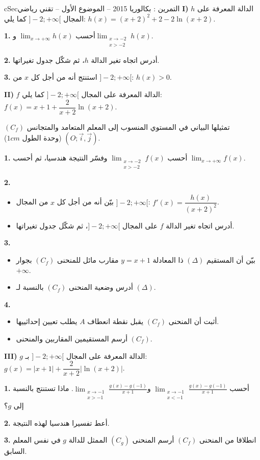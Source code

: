 \documentclass[12pt,a4paper]{article}
\newenvironment{BOX}[2]{\begin{otherlanguage}{english}\begin{arbox}{#1}{#2}}{\end{arbox}\end{otherlanguage}}
\newcounter{exo}
\newenvironment{tamrin}[1]{\stepcounter{exo}\begin{BOX}{cSec}{التمرين \theexo: #1}}{\end{BOX}}
\newenvironment{sq}{\begin{itemize}[leftmargin=2.4em,itemsep=3pt]}{\end{itemize}}
\newcommand{\qa}{\item[(أ)]}\newcommand{\qb}{\item[(ب)]}\newcommand{\qc}{\item[(جـ)]}\newcommand{\qd}{\item[(د)]}\newcommand{\qe}{\item[(هـ)]}
\newcommand{\QQ}[1]{\par\smallskip\textbf{#1.} }
\begin{document}
\begin{tamrin}{بكالوريا 2015 -- الموضوع الأول -- تقني رياضي}
\textbf{I)} $h$ الدالة المعرفة على المجال $]-2;+\infty[$ كما يلي: $h(x)=(x+2)^2+2-2\ln(x+2)$.
\QQ{1} أحسب $\displaystyle\lim_{x\to+\infty}h(x)$ و$\displaystyle\lim_{\substack{x\to-2\\x>-2}}h(x)$.
\QQ{2} أدرس اتجاه تغير الدالة $h$، ثم شكّل جدول تغيراتها.
\QQ{3} استنتج أنه من أجل كل $x$ من $]-2;+\infty[$: $h(x)>0$.

\textbf{II)} $f$ الدالة المعرفة على المجال $]-2;+\infty[$ كما يلي: $f(x)=x+1+\dfrac{2}{x+2}\ln(x+2)$.

$(C_f)$ تمثيلها البياني في المستوي المنسوب إلى المعلم المتعامد والمتجانس $(O;\vec{i},\vec{j})$ (وحدة الطول $1cm$).
\QQ{1} أحسب $\displaystyle\lim_{\substack{x\to-2\\x>-2}}f(x)$ وفسّر النتيجة هندسيا، ثم أحسب $\displaystyle\lim_{x\to+\infty}f(x)$.
\QQ{2}
\begin{sq}
\qa بيّن أنه من أجل كل $x$ من المجال $]-2;+\infty[$: $f'(x)=\dfrac{h(x)}{(x+2)^2}$.
\qb أدرس اتجاه تغير الدالة $f$ على المجال $]-2;+\infty[$، ثم شكّل جدول تغيراتها.
\end{sq}
\QQ{3}
\begin{sq}
\qa بيّن أن المستقيم $(\Delta)$ ذا المعادلة $y=x+1$ مقارب مائل للمنحنى $(C_f)$ بجوار $+\infty$.
\qb أدرس وضعية المنحنى $(C_f)$ بالنسبة لـ $(\Delta)$.
\end{sq}
\QQ{4}
\begin{sq}
\qa أثبت أن المنحنى $(C_f)$ يقبل نقطة انعطاف $A$ يطلب تعيين إحداثييها.
\qb أرسم المستقيمين المقاربين والمنحنى $(C_f)$.
\end{sq}

\textbf{III)} $g$ الدالة المعرفة على المجال $]-2;+\infty[$ بـ: $g(x)=|x+1|+\dfrac{2}{x+2}\left|\ln(x+2)\right|$.
\QQ{1} أحسب $\displaystyle\lim_{\substack{x\to-1\\x<-1}}\frac{g(x)-g(-1)}{x+1}$ و$\displaystyle\lim_{\substack{x\to-1\\x>-1}}\frac{g(x)-g(-1)}{x+1}$. ماذا تستنتج بالنسبة إلى $g$؟
\QQ{2} أعط تفسيرا هندسيا لهذه النتيجة.
\QQ{3} انطلاقا من المنحنى $(C_f)$ أرسم المنحنى $(C_g)$ الممثل للدالة $g$ في نفس المعلم السابق.
\end{tamrin}
\end{document}
